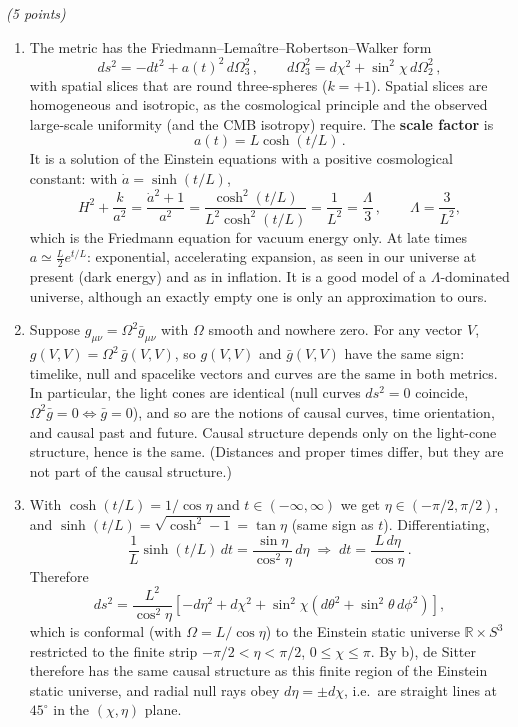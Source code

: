 \documentclass[12pt]{article}
\newcommand{\be}{\begin{equation}}
\newcommand{\ee}{\end{equation}}
\newcounter{quesno}
\newcommand{\ques}[1]{\vspace{2em}\stepcounter{quesno}
\noindent{\bf Question \thequesno.} \emph{(#1 points)\\}
}
\begin{document}
\ques{5}
\begin{enumerate}[label=\alph*)]
\item The metric has the Friedmann--Lema\^{i}tre--Robertson--Walker form
\be
ds^2=-dt^2+a(t)^2\,d\Omega_3^2\,,\qquad d\Omega_3^2=d\chi^2+\sin^2\chi\,d\Omega_2^2\,,
\ee
with spatial slices that are round three-spheres ($k=+1$). Spatial slices are homogeneous and isotropic, as the cosmological principle and the observed large-scale uniformity (and the CMB isotropy) require. The \textbf{scale factor} is
\be
a(t)=L\cosh(t/L)\,.
\ee
It is a solution of the Einstein equations with a positive cosmological constant: with $\dot a=\sinh(t/L)$,
\be
H^2+\frac{k}{a^2}=\frac{\dot a^2+1}{a^2}=\frac{\cosh^2(t/L)}{L^2\cosh^2(t/L)}=\frac1{L^2}=\frac{\Lambda}{3}\,,\qquad \Lambda=\frac{3}{L^2},
\ee
which is the Friedmann equation for vacuum energy only. At late times $a\simeq\frac L2e^{t/L}$: exponential, accelerating expansion, as seen in our universe at present (dark energy) and as in inflation. It is a good model of a $\Lambda$-dominated universe, although an exactly empty one is only an approximation to ours.

\item Suppose $g_{\mu\nu}=\Omega^2\bar g_{\mu\nu}$ with $\Omega$ smooth and nowhere zero. For any vector $V$, $g(V,V)=\Omega^2\,\bar g(V,V)$, so $g(V,V)$ and $\bar g(V,V)$ have the same sign: timelike, null and spacelike vectors and curves are the same in both metrics. In particular, the light cones are identical (null curves $ds^2=0$ coincide, $\Omega^2\bar g=0\Leftrightarrow\bar g=0$), and so are the notions of causal curves, time orientation, and causal past and future. Causal structure depends only on the light-cone structure, hence is the same. (Distances and proper times differ, but they are not part of the causal structure.)

\item With $\cosh(t/L)=1/\cos\eta$ and $t\in(-\infty,\infty)$ we get $\eta\in(-\pi/2,\pi/2)$, and $\sinh(t/L)=\sqrt{\cosh^2-1}=\tan\eta$ (same sign as $t$). Differentiating,
\be
\frac1L\sinh(t/L)\,dt=\frac{\sin\eta}{\cos^2\eta}\,d\eta
\;\Rightarrow\; dt=\frac{L\,d\eta}{\cos\eta}\,.
\ee
Therefore
\be
ds^2=\frac{L^2}{\cos^2\eta}\left[-d\eta^2+d\chi^2+\sin^2\chi\left(d\theta^2+\sin^2\theta\,d\phi^2\right)\right],
\ee
which is conformal (with $\Omega=L/\cos\eta$) to the Einstein static universe $\mathbb R\times S^3$ restricted to the finite strip $-\pi/2<\eta<\pi/2$, $0\le\chi\le\pi$. By b), de Sitter therefore has the same causal structure as this finite region of the Einstein static universe, and radial null rays obey $d\eta=\pm d\chi$, i.e.\ are straight lines at $45^\circ$ in the $(\chi,\eta)$ plane.


\end{enumerate}
\end{document}
